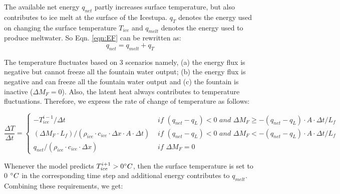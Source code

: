 \documentclass[utf8]{frontiersSCNS} %
\begin{document}
The available net energy $q_{net}$ partly increases surface temperature, but also contributes to ice melt at the surface
of the Icestupa. $q_{T}$ denotes the energy used on changing the surface temperature $T_{ice}$ and $q_{melt}$ denotes
the energy used to produce meltwater. So Eqn. \ref{eqn:EF} can be rewritten as: \begin{equation} q_{net} = q_{melt} +
  q_{T} \end{equation}

The temperature fluctuates based on 3 scenarios namely, (a) the energy flux is negative but cannot freeze all the
fountain water output; (b) the energy flux is negative and can freeze all the fountain water output and (c) the fountain
is inactive ($\Delta M_{F}=0$). Also, the latent heat always contributes to temperature fluctuations. Therefore, we
express the rate of change of temperature as follows:

\begin{equation} \frac{\Delta T}{\Delta t} = \left\{ \begin{array}{ll} -T_{ice}^{i-1}/\Delta t & \textit{ if }
    (q_{net}-q_{L}) < 0 \textit{ and } \Delta M_{F} \geq -(q_{net}-q_{L})\cdot A \cdot \Delta t/L_f  \\ (\Delta M_{F}
    \cdot L_f )/(\rho_{ice} \cdot c_{ice} \cdot  \Delta x \cdot A \cdot \Delta t) & \textit{ if } (q_{net}-q_{L}) < 0
    \textit{ and } \Delta M_{F} < -(q_{net}-q_{L})\cdot A \cdot \Delta t/L_f  \\ q_{net}/ (\rho_{ice}\cdot c_{ice} \cdot
    \Delta x)& \textit{ if } \Delta M_{F} = 0
         
    \end{array} \right.  \label{eqn:T} \end{equation}

Whenever the model predicts $T_{ice}^{i+1} > 0 \degree C$, then the surface temperature is set to 0 $\degree C$ in the
corresponding time step and additional energy contributes to $q_{melt}$. Combining these requirements, we get:
\end{document}
